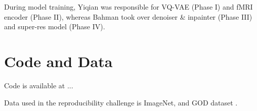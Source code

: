 \documentclass{article}
\theoremstyle{plain}
\theoremstyle{definition}
\theoremstyle{remark}
\begin{document}
During model training, Yiqian was responsible for VQ-VAE (Phase I) and fMRI encoder (Phase II), whereas Bahman took over denoiser \& inpainter (Phase III) and super-res model (Phase IV).


\section*{Code and Data}

\todo

Code is available at ...

Data used in the reproducibility challenge is ImageNet, and GOD dataset \cite{horikawa2016}.

%
%





\end{document}
